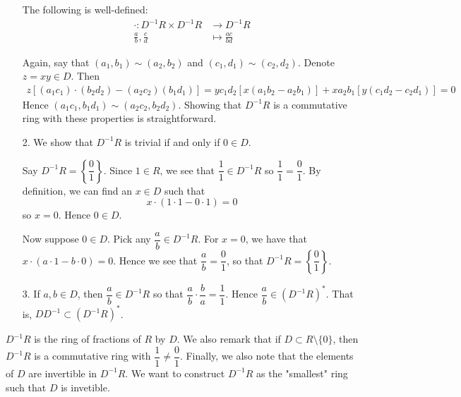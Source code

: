 \documentclass[12pt,letterpaper]{algebra_book}
\theoremstyle{definition}
\begin{document}
\begin{prf}
\begin{itemize}
            \begin{lemma}
                The following is well-defined:
                \begin{align*}
                    \cdot: D^{-1}R \times D^{-1}R &\longrightarrow D^{-1}R\\
                    \frac{a}{b}, \frac{c}{d} &\longmapsto \frac{ac}{bd}
                \end{align*}
            \end{lemma}
            Again, say that $(a_1, b_1) \sim (a_2, b_2)$ and $(c_1, d_1)
            \sim (c_2, d_2)$. Denote $z = xy \in D$. Then 
            \begin{align*}
                z[(a_1c_1) \cdot(b_2d_2) - (a_2c_2)(b_1d_1)]
                =
                yc_1d_2[x(a_1b_2 - a_2b_1)]
                + 
                xa_2b_1[y(c_1d_2 - c_2d_1)]
                = 0
            \end{align*}
        Hence $(a_1c_1, b_1d_1) \sim (a_2c_2, b_2d_2)$. Showing
        that $D^{-1}R$ is a commutative ring with these properties
        is straightforward. 
    
            \item[2.] We show that $D^{-1}R$ is trivial if and only
            if $0 \in D$. 
    
            Say $D^{-1}R = \left\{\dfrac{0}{1}\right\}$. Since $1 \in R$, we see that
            $\dfrac{1}{1} \in D^{-1}R$ so $\dfrac{1}{1} = \dfrac{0}{1}$. By
            definition, we can find an $x \in D$ such that 
            \[
                x \cdot (1 \cdot 1 - 0 \cdot 1) = 0
            \]
            so $x = 0$. Hence $0 \in D$. 
    
            Now suppose $0 \in D$. Pick any $\dfrac{a}{b} \in D^{-1}R$.
            For $x = 0$, we have that $x \cdot (a \cdot 1 - b \cdot 0) =
            0$. Hence we see that $\dfrac{a}{b} = \dfrac{0}{1}$, so that
            $D^{-1}R = \left\{\dfrac{0}{1}\right\}$.
        
            \item[3.] If $a, b \in D$, then $\dfrac{a}{b} \in
            D^{-1}R$ so that $\dfrac{a}{b} \cdot \dfrac{b}{a} =
            \dfrac{1}{1}$. Hence $\dfrac{a}{b} \in (D^{-1}R)^{*}$. That
            is, $DD^{-1} \subset (D^{-1}R)^*$. 
        \end{itemize}
    \end{prf}
    $D^{-1}R$ is the ring of fractions of $R$ by $D$. We also
    remark that if $D \subset R \setminus \{0\}$, then $D^{-1}R$
    is a commutative ring with $\dfrac{1}{1} \ne \dfrac{0}{1}$.
    Finally, we also note that the elements of $D$ are invertible
    in $D^{-1}R$. We want to construct $D^{-1}R$ as the "smallest"
    ring such that $D$ is invetible.
\end{document}
